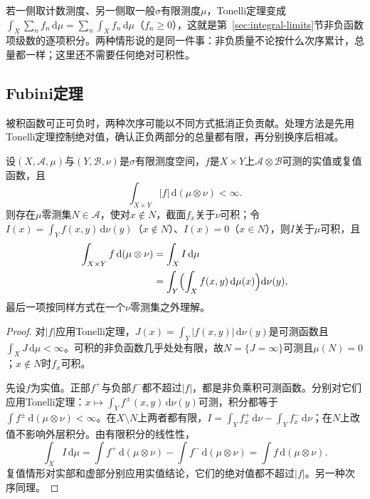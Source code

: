 若一侧取计数测度、另一侧取一般$\sigma$有限测度$\mu$，Tonelli定理变成$\int_X\sum_nf_n\,\mathrm d\mu=\sum_n\int_Xf_n\,\mathrm d\mu$（$f_n\ge0$），这就是第~\ref{sec:integral-limits}节非负函数项级数的逐项积分。两种情形说的是同一件事：非负质量不论按什么次序累计，总量都一样；这里还不需要任何绝对可积性。

\subsection{Fubini定理}
\label{sec:integral-fubini}

被积函数可正可负时，两种次序可能以不同方式抵消正负贡献。处理方法是先用Tonelli定理控制绝对值，确认正负两部分的总量都有限，再分别换序后相减。

\begin{theorem}[Fubini定理]
\label{thm:integral-fubini}
设$(X,\mathcal A,\mu)$与$(Y,\mathcal B,\nu)$是$\sigma$有限测度空间，$f$是$X\times Y$上$\mathcal A\otimes\mathcal B$可测的实值或复值函数，且
\[
 \int_{X\times Y}|f|\,\mathrm d(\mu\otimes\nu)<\infty.
\]
则存在$\mu$零测集$N\in\mathcal A$，使对$x\notin N$，截面$f_x$关于$\nu$可积；令$I(x)=\int_Yf(x,y)\,\mathrm d\nu(y)$（$x\notin N$）、$I(x)=0$（$x\in N$），则$I$关于$\mu$可积，且
\begin{equation}
 \begin{aligned}
 \int_{X\times Y}f\,\mathrm d(\mu\otimes\nu)&=\int_XI\,\mathrm d\mu\\
 &=\int_Y\Bigl(\int_Xf(x,y)\,\mathrm d\mu(x)\Bigr)\mathrm d\nu(y),
 \end{aligned}
 \label{eq:integral-fubini}
\end{equation}
最后一项按同样方式在一个$\nu$零测集之外理解。
\end{theorem}

\begin{proof}
对$|f|$应用Tonelli定理，$J(x)=\int_Y|f(x,y)|\,\mathrm d\nu(y)$是可测函数且$\int_XJ\,\mathrm d\mu<\infty$。可积的非负函数几乎处处有限，故$N=\{J=\infty\}$可测且$\mu(N)=0$；$x\notin N$时$f_x$可积。

先设$f$为实值。正部$f^+$与负部$f^-$都不超过$|f|$，都是非负乘积可测函数。分别对它们应用Tonelli定理：$x\mapsto\int_Yf^\pm(x,y)\,\mathrm d\nu(y)$可测，积分都等于$\int f^\pm\,\mathrm d(\mu\otimes\nu)<\infty$。在$X\setminus N$上两者都有限，$I=\int_Yf_x^+\,\mathrm d\nu-\int_Yf_x^-\,\mathrm d\nu$；在$N$上改值不影响外层积分。由有限积分的线性性，
\[
 \int_XI\,\mathrm d\mu=\int f^+\,\mathrm d(\mu\otimes\nu)-\int f^-\,\mathrm d(\mu\otimes\nu)=\int f\,\mathrm d(\mu\otimes\nu).
\]
复值情形对实部和虚部分别应用实值结论，它们的绝对值都不超过$|f|$。另一种次序同理。
\end{proof}


